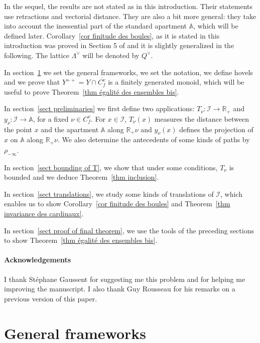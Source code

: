 \documentclass[12pt]{article}
\theoremstyle{plain}
\theoremstyle{definition}
\newcommand{\R}{\mathbb{R}}
\newcommand{\A}{\mathbb{A}}
\newcommand{\I}{\mathcal{I}}
\begin{document}
In the sequel, the results are not stated as in this introduction. Their statements use retractions and vectorial distance. They are also a bit more general: they take into account the inessential part of the standard apartment $\A$, which will be defined later.  Corollary~\ref{cor finitude des boules}, as it is stated in this introduction was proved in Section 5 of \cite{gaussent2014spherical} and it is slightly generalized in the following. The lattice $\Lambda^\vee$ will be denoted by $Q^\vee$.


\medskip

In section~\ref{sect general frameworks} we set the general frameworks, we set the notation, we define hovels and we prove that $Y^{++}=Y\cap \overline{C^v_f}$ is a finitely generated monoid, which will be useful to prove Theorem~\ref{thm égalité des ensembles bis}.

 In section~\ref{sect preliminaries} we first define two applications: $T_\nu:\I\rightarrow\R_+$ and $y_\nu:\I\rightarrow \A$, for a fixed $\nu\in C_f^v$. For $x\in\I$, $T_\nu(x)$ measures the distance between the point $x$ and the apartment $\A$ along $\R_+\nu$ and $y_\nu(x)$ defines the projection of $x$ on $\A$ along $\R_+\nu$. We also determine the antecedents of some kinds of paths by $\rho_{-\infty}$. 
 
 In section~\ref{sect bounding of T}, we show that under some conditions, $T_\nu$ is bounded and we deduce Theorem~\ref{thm inclusion}. 
 
 In section~\ref{sect translations}, we study some kinds of translations of $\I$, which enables us to show Corollary~\ref{cor finitude des boules} and Theorem~\ref{thm invariance des cardinaux}.

 
 In section~\ref{sect proof of final theorem}, we use the tools of the preceding sections to show Theorem~\ref{thm égalité des ensembles bis}. 




\paragraph{Acknowledgements}
I thank Stéphane Gaussent for suggesting me this problem and for helping me improving the manuscript. I also thank Guy Rousseau for his remarks on a previous version of this paper.





\section{General frameworks}\label{sect general frameworks}
\end{document}
